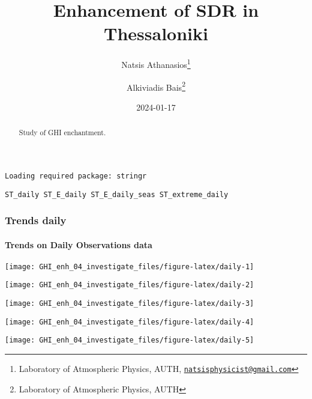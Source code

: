 \documentclass[
  10pt,
  a4paper,oneside]{article}
\title{Enhancement of SDR in Thessaloniki}
\author{Natsis Athanasios\footnote{Laboratory of Atmospheric Physics, AUTH, \href{mailto:natsisphysicist@gmail.com}{\nolinkurl{natsisphysicist@gmail.com}}} \and Alkiviadis Bais\footnote{Laboratory of Atmospheric Physics, AUTH}}
\date{2024-01-17}
\begin{document}
\maketitle
\begin{abstract}
Study of GHI enchantment.
\end{abstract}

{
\hypersetup{linkcolor=}
\setcounter{tocdepth}{4}
\tableofcontents
}
\begin{verbatim}
Loading required package: stringr
\end{verbatim}

\begin{verbatim}
ST_daily ST_E_daily ST_E_daily_seas ST_extreme_daily
\end{verbatim}

\newpage
\FloatBarrier

\hypertarget{trends-daily}{%
\subsubsection{Trends daily}\label{trends-daily}}

\newpage

\hypertarget{trends-on-daily-observations-data}{%
\paragraph{Trends on Daily Observations data}\label{trends-on-daily-observations-data}}

\begin{center}\texttt{[image: GHI\_enh\_04\_investigate\_files/figure-latex/daily-1]} \end{center}

\begin{center}\texttt{[image: GHI\_enh\_04\_investigate\_files/figure-latex/daily-2]} \end{center}

\begin{center}\texttt{[image: GHI\_enh\_04\_investigate\_files/figure-latex/daily-3]} \end{center}

\begin{center}\texttt{[image: GHI\_enh\_04\_investigate\_files/figure-latex/daily-4]} \end{center}

\begin{center}\texttt{[image: GHI\_enh\_04\_investigate\_files/figure-latex/daily-5]} \end{center}
\end{document}
